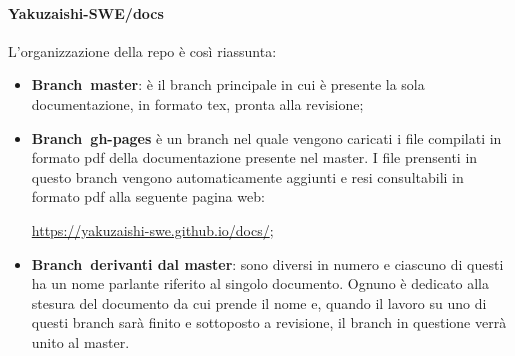         \paragraph{Yakuzaishi-SWE/docs}
        L'organizzazione della repo è così riassunta:
        \begin{itemize}
            \item \textbf{Branch\glo\ master}: è il branch principale in cui è presente la sola documentazione, in formato tex, pronta alla revisione;
            \item \textbf{Branch\glo\ gh-pages} è un branch nel quale vengono caricati i file compilati in formato pdf della documentazione presente nel master. I file prensenti in questo branch vengono automaticamente aggiunti e resi consultabili in formato pdf alla seguente pagina web:
            \begin{center}
                \url{https://yakuzaishi-swe.github.io/docs/};
            \end{center}
            \item \textbf{Branch\glo\ derivanti dal master}: sono diversi in numero e ciascuno di questi ha un nome parlante riferito al singolo documento. Ognuno è dedicato alla stesura del documento da cui prende il nome e, quando il lavoro su uno di questi branch sarà finito e sottoposto a revisione, il branch in questione verrà unito al master.
        \end{itemize}

